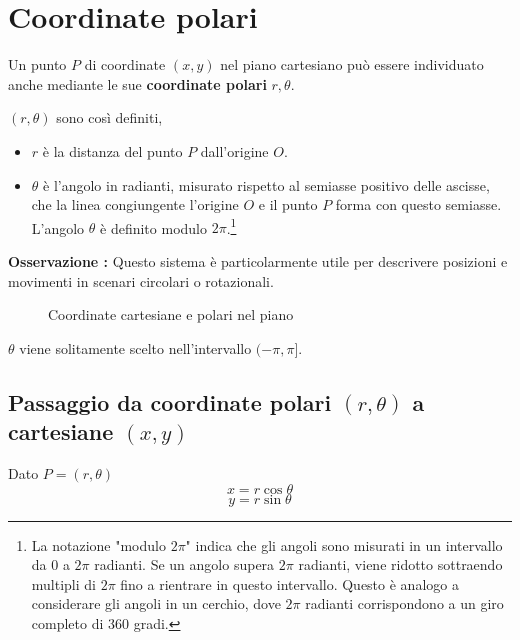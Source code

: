 \documentclass{book}
\begin{document}
\section{Coordinate polari}
Un punto \(P\) di coordinate \((x , y)\) nel piano cartesiano può essere individuato anche mediante le sue \textbf{coordinate polari} \(r, \theta\).
\begin{definition}
    \((r, \theta)\) sono così definiti,
    \begin{itemize}
        \item \textbf{\(r\)} è la distanza del punto \(P\) dall'origine \(O\).
        \item \textbf{\( \theta \)} è l'angolo in radianti, misurato rispetto al semiasse positivo delle ascisse, che la linea congiungente l'origine \( O \) e il punto \( P \) forma con questo semiasse. L'angolo \( \theta \) è definito modulo \( 2\pi \).\footnote{La notazione "modulo \( 2\pi \)" indica che gli angoli sono misurati in un intervallo da 0 a \( 2\pi \) radianti. Se un angolo supera \( 2\pi \) radianti, viene ridotto sottraendo multipli di \( 2\pi \) fino a rientrare in questo intervallo. Questo è analogo a considerare gli angoli in un cerchio, dove \( 2\pi \) radianti corrispondono a un giro completo di 360 gradi.}
    \end{itemize}
    \textbf{Osservazione :}
    Questo sistema è particolarmente utile per descrivere posizioni e movimenti in scenari circolari o rotazionali.
\end{definition}
\begin{figure}[H]
    \centering
    \caption{Coordinate cartesiane e polari nel piano}
\end{figure}
\(\theta\) viene solitamente scelto nell'intervallo \((-\pi,\pi]\).
\subsection{Passaggio da coordinate polari \texorpdfstring{\((r, \theta)\)}{(r, theta)} a cartesiane \texorpdfstring{\((x, y)\)}{(x, y)}}
\begin{theorem}
    Dato \(P = (r, \theta)\)
    \[x = r \cos{\theta}\]
    \[y = r \sin{\theta}\]
\end{theorem}
\end{document}
